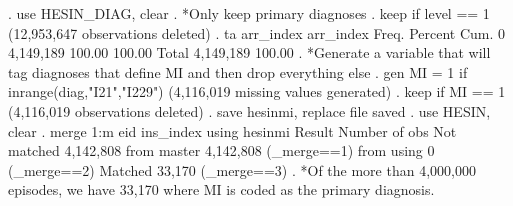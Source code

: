 . use HESIN_DIAG, clear
{\smallskip}
. *Only keep primary diagnoses
. keep if level == 1
(12,953,647 observations deleted)
{\smallskip}
. ta arr_index
{\smallskip}
  arr_index {\VBAR}      Freq.     Percent        Cum.
          0 {\VBAR}  4,149,189      100.00      100.00
      Total {\VBAR}  4,149,189      100.00
{\smallskip}
. *Generate a variable that will tag diagnoses that define MI and then drop everything else
. gen MI = 1 if inrange(diag,"I21","I229")
(4,116,019 missing values generated)
{\smallskip}
. keep if MI == 1
(4,116,019 observations deleted)
{\smallskip}
. save hesinmi, replace
file{} saved
{\smallskip}
. use HESIN, clear
{\smallskip}
. merge 1:m eid ins_index using hesinmi
{\smallskip}
    Result                      Number of obs
    Not matched                     4,142,808
        from master                 4,142,808  (_merge==1)
        from using                          0  (_merge==2)
{\smallskip}
    Matched                            33,170  (_merge==3)
{\smallskip}
. *Of the more than 4,000,000 episodes, we have 33,170 where MI is coded as the primary diagnosis.
